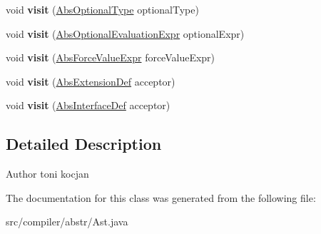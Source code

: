 \begin{DoxyCompactItemize}
\item 
\mbox{\label{classcompiler_1_1abstr_1_1_ast_a562aaad88f0ec66c981adde2379bcc51}} 
void {\bfseries visit} (\hyperlink{classcompiler_1_1abstr_1_1tree_1_1type_1_1_abs_optional_type}{Abs\+Optional\+Type} optional\+Type)
\item 
\mbox{\label{classcompiler_1_1abstr_1_1_ast_a098cd0fadf93c6adeb96e0699172e259}} 
void {\bfseries visit} (\hyperlink{classcompiler_1_1abstr_1_1tree_1_1expr_1_1_abs_optional_evaluation_expr}{Abs\+Optional\+Evaluation\+Expr} optional\+Expr)
\item 
\mbox{\label{classcompiler_1_1abstr_1_1_ast_ad791944cf60d225b6eb790628293d4ae}} 
void {\bfseries visit} (\hyperlink{classcompiler_1_1abstr_1_1tree_1_1expr_1_1_abs_force_value_expr}{Abs\+Force\+Value\+Expr} force\+Value\+Expr)
\item 
\mbox{\label{classcompiler_1_1abstr_1_1_ast_ae64e1ad615ff9c432752b0f869a38983}} 
void {\bfseries visit} (\hyperlink{classcompiler_1_1abstr_1_1tree_1_1def_1_1_abs_extension_def}{Abs\+Extension\+Def} acceptor)
\item 
\mbox{\label{classcompiler_1_1abstr_1_1_ast_a1df054bf223b1577df021ff2e6ef4938}} 
void {\bfseries visit} (\hyperlink{classcompiler_1_1abstr_1_1tree_1_1def_1_1_abs_interface_def}{Abs\+Interface\+Def} acceptor)
\end{DoxyCompactItemize}


\subsection{Detailed Description}
\begin{DoxyAuthor}{Author}
toni kocjan 
\end{DoxyAuthor}


The documentation for this class was generated from the following file\+:\begin{DoxyCompactItemize}
\item 
src/compiler/abstr/Ast.\+java\end{DoxyCompactItemize}
